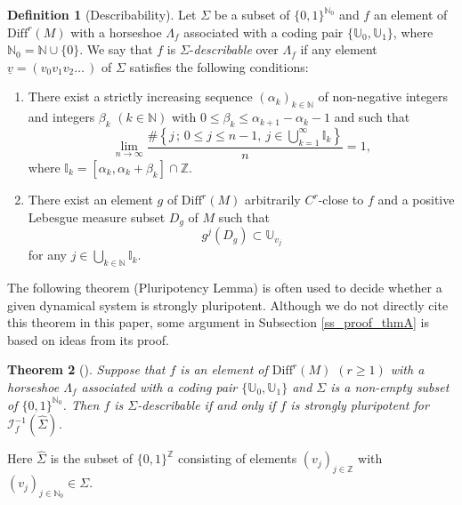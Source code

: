 \documentclass{amsart}
\theoremstyle{plain}
\newtheorem{thm}{Theorem}[section]
\theoremstyle{definition}
\newtheorem{dfn}[thm]{Definition}
\numberwithin{equation}{section}
\numberwithin{figure}{section}
\begin{document}
\begin{dfn}[Describability]\label{describable}
Let $\Sigma$ be a subset of $\{0,1\}^{\mathbb N_0}$ and 
$f$ an element of $\mathrm{Diff}^{r}(M)$ with a horseshoe $\Lambda_f$ associated with a coding pair $\{ \mathbb U_0, \mathbb U_1 \}$, 
where $\mathbb N_0=\mathbb{N}\cup \{0\}$.  
We say that $f$ is $\Sigma$-\emph{describable} over $\Lambda_f$  
if any element $\underline{v}=(v_{0}v_{1}v_{2}\ldots\,)$ of $\Sigma$
satisfies the following conditions: 

\begin{enumerate}[({D}1)]
\makeatletter
\renewcommand{\p@enumi}{D}
\makeatother
\item\label{D1}
There exist a strictly increasing sequence $(\alpha _k)_{k\in \mathbb N}$ of non-negative integers and 
integers $\beta _k$ $(k\in \mathbb N)$ with $0\leq \beta _k\leq \alpha _{k+1}-\alpha _k-1$ and  
such that 
\[
\lim _{n\rightarrow \infty} \frac{\#\left\{j\,;\, 0\le j \le n-1,\ j \in \bigcup _{k=1}^\infty \mathbb{I}_k\right\}}{n} =1, 
\]
where $\mathbb{I}_k
=[\alpha_k, \alpha _k+ \beta_k] \cap \mathbb Z$.
\item\label{D2}
There exist an element $g$ of $\mathrm{Diff}^{r}(M)$ arbitrarily $C^r$-close to $f$ and  
a positive Lebesgue measure subset $D_g$ of $M$  
such that  
\[
g^j (D_g) \subset \mathbb U_{v_{j}}
\]
for any  $j\in \bigcup_{k\in \mathbb{N}
} \mathbb I_k$.  
\end{enumerate}
\end{dfn}



The following theorem (Pluripotency Lemma) is often used to decide whether a given dynamical system is strongly pluripotent. 
Although we do not directly cite this theorem in this paper, some argument in Subsection \ref{ss_proof_thmA} is based on ideas from its proof.




\begin{thm}[{\cite[Theorem A]{KNS}}]\label{p-lemma}
Suppose that $f$ is an element of $\mathrm{Diff}^r(M)$ $(r\geq 1)$ with a horseshoe $\Lambda_f$ associated with a coding pair $\{ \mathbb U_0, \mathbb U_1 \}$ and 
$\Sigma$ is a non-empty subset of $\{0,1\}^{\mathbb N_0}$.
Then $f$ is $\Sigma$-describable if and only if 
$f$ is strongly pluripotent for $\mathcal{I}_f^{-1}(\widehat \Sigma)$.
\end{thm}
Here $\widehat \Sigma$ is the subset of $\{0,1\}^{\mathbb{Z}}$ consisting of elements 
$(v_j)_{j\in \mathbb{Z}}$ with $(v_j)_{j\in \mathbb{N}_0}\in \Sigma$.
\end{document}
